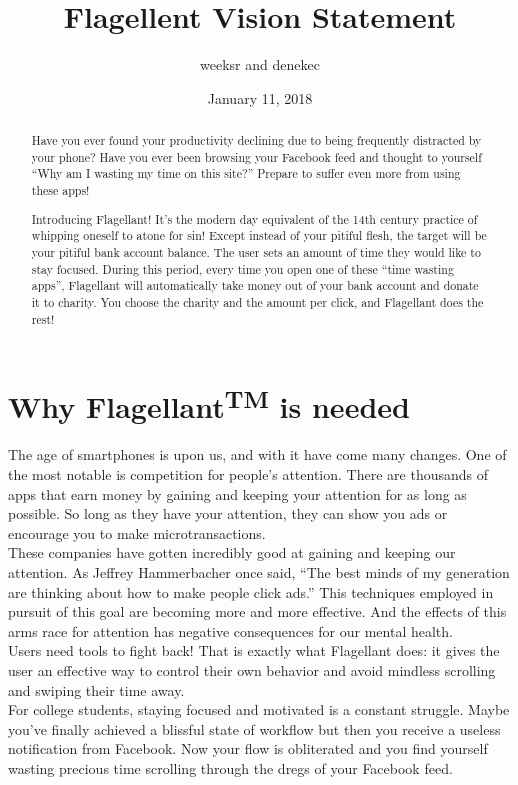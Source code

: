 \documentclass[12pt]{article}
\title{Flagellent Vision Statement}
\author{weeksr and denekec}
\date{January 11, 2018}
\begin{document}
\maketitle

\begin{abstract}
Have you ever found your productivity declining due to being frequently distracted by your phone? Have you ever been browsing your Facebook feed and thought to yourself “Why am I wasting my time on this site?” Prepare to suffer even more from using these apps!


Introducing Flagellant! It’s the modern day equivalent of the 14th century practice of whipping oneself to atone for sin! Except instead of your pitiful flesh, the target will be your pitiful bank account balance.
The user sets an amount of time they would like to stay focused. During this period, every time you open one of these “time wasting apps”, Flagellant will automatically take money out of your bank account and donate it to charity. You choose the charity and the amount per click, and Flagellant does the rest!
\end{abstract}

\section{Why Flagellant\textsuperscript{TM}  is needed}
The age of smartphones is upon us, and with it have come many changes. One of the most notable is competition for people’s attention. There are thousands of apps that earn money by gaining and keeping your attention for as long as possible. So long as they have your attention, they can show you ads or encourage you to make microtransactions. \\


These companies have gotten incredibly good at gaining and keeping our attention. As Jeffrey Hammerbacher once said, “The best minds of my generation are thinking about how to make people click ads.” This techniques employed in pursuit of this goal are becoming more and more effective. And the effects of this arms race for attention has negative consequences for our mental health.\cite{forbes}
 \\


Users need tools to fight back! That is exactly what Flagellant does: it gives the user an effective way to control their own behavior and avoid mindless scrolling and swiping their time away. \\


For college students, staying focused and motivated is a constant struggle. Maybe you’ve finally achieved a blissful state of workflow but then you receive a useless notification from Facebook. Now your flow is obliterated and you find yourself wasting precious time scrolling through the dregs of your Facebook feed. \\
\end{document}
